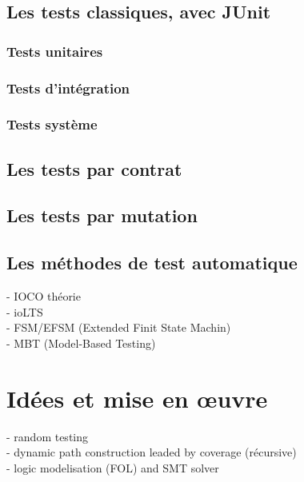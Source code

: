 \documentclass[a4paper]{report}
\begin{document}
\section*{Les tests classiques, avec JUnit}
\subsection*{Tests unitaires}
\subsection*{Tests d'intégration}
\subsection*{Tests système}
\section*{Les tests par contrat}
\section*{Les tests par mutation}

\section*{Les méthodes de test automatique}
- IOCO théorie\\
- ioLTS\\
- FSM/EFSM (Extended Finit State Machin)\\
- MBT (Model-Based Testing)




\chapter*{Idées et mise en œuvre}
- random testing\\
- dynamic path construction leaded by coverage (récursive)\\
- logic modelisation (FOL) and SMT solver\\
\end{document}
